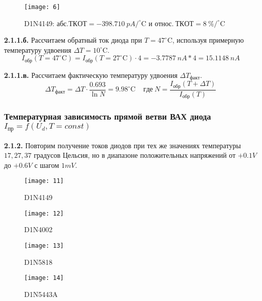 \documentclass{semi}
\newcommand{\Cd}{^{\circ}\mathrm{C}}
\begin{document}
\begin{figure}[H]
	\centering
	\texttt{[image: 6]}
	\caption{D1N4149: $ абс.ТКОТ = -398.710~pA/\Cd $ и $ относ.~ТКОТ = 8~\%/\Cd $}
	\label{2.1.1.1}
\end{figure}

\textbf{{\normalsize 2.1.1.б.}}
Рассчитаем обратный ток диода при $ T = 47\Cd $, используя примерную температуру удвоения $ \Delta T = 10\Cd $.
\begin{equation}\label{eq:2.1.1.2}
I_{обр}(T = 47\Cd) = I_{обр}(T = 27\Cd) \cdot 4 = -3.7787~nA * 4 = 15.1148~nA
\end{equation}

\textbf{{\normalsize 2.1.1.в.}}
Рассчитаем фактическую температуру удвоения $ \Delta T_{факт} $.
\begin{equation}\label{eq:T_fact}
\Delta T_{факт} = \Delta T \cdot \dfrac{0.693}{\ln N} = 9.98 \Cd ~~~~~ где ~ N = \dfrac{I_{обр}(T + \Delta T)}{I_{обр}(T)}
\end{equation}


\subsubsection*{Температурная зависимость прямой ветви ВАХ диода\\
$ I_{пр} = f(U_d, T = const) $}

\textbf{{\normalsize 2.1.2.}}
Повторим получение токов диодов при тех же значениях температуры $ 17, 27, 37 $ градусов Цельсия, но в диапазоне положительных напряжений от $ +0.1V $ до $ +0.6V $ с шагом $ 1mV $.

\begin{figure}[H]
	\centering
	\texttt{[image: 11]}
	\caption{D1N4149}
	\label{2.1.2_1}
\end{figure}

\begin{figure}[H]
	\centering
	\texttt{[image: 12]}
	\caption{D1N4002}
	\label{2.1.2_2}
\end{figure}

\begin{figure}[H]
	\centering
	\texttt{[image: 13]}
	\caption{D1N5818}
	\label{2.1.2_3}
\end{figure}

\begin{figure}[H]
	\centering
	\texttt{[image: 14]}
	\caption{D1N5443A}
	\label{2.1.2_4}
\end{figure}
\end{document}

